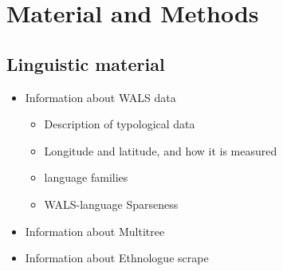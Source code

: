\documentclass[11pt]{article}
\begin{document}
\section{Material and Methods}
\subsection{Linguistic material}
\begin{itemize}
\item Information about WALS data

\begin{itemize} \item Description of typological data

%
%
%
%
%
%
%

\item Longitude and latitude, and how it is measured
%
\item language families
\item WALS-language Sparseness \end{itemize}
\item Information about Multitree\cite{multitree}
\item Information about Ethnologue\cite{ethnologue} scrape %
\end{itemize}
\end{document}
